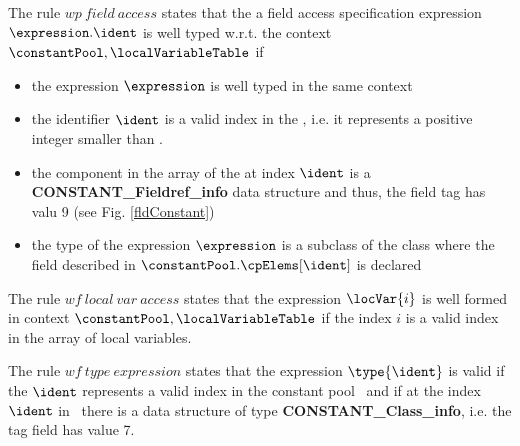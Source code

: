 The rule $ wp \ field \ access $ states that the  a field access specification expression $ \expression.\ident $ is well typed
w.r.t. the context $\constantPool , \localVariableTable  $ if
 \begin{itemize}
   \item the expression  $ \expression$ is well typed in the same context 
   \item the identifier $ \ident $ is a valid index in the \constantPool, i.e. it represents a positive integer smaller than \constantPool.\cpLength 
   \item the component in the array of the \constantPool at index $\ident$ is a \\
         \mbox{\rm\textbf{CONSTANT\_Fieldref\_info}} data structure and thus, the field \textsf{tag}  has valu  9 (see Fig. \ref{fldConstant})
   \item the type of the expression $ \expression$ is a subclass of the class where the field described in $ \constantPool .\cpElems[\ident]$
         is declared 

\end{itemize}



The rule $wf \ local \ var \ access$ states that the expression $ \locVar{i}$ is well formed in context  
$\constantPool , \localVariableTable$ if the index $i$ is a valid index in the array of local variables.


The rule $ wf \ type \ expression $ states that the expression $\type{\ident}  $ is valid if the $\ident$ represents a valid
index in the constant pool \constantPool \ and if at the index  $ \ident $ in \constantPool \ there is a data structure of type \textbf{CONSTANT\_Class\_info}, i.e.
 the \textsf{tag} field has value 7.

